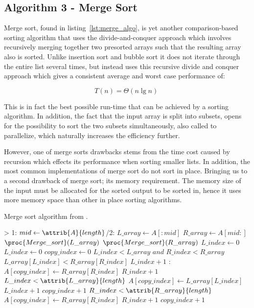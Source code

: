 \documentclass[sigconf, nonacm, natbib, screen, balance=False]{acmart}
\begin{document}
\subsection{Algorithm 3 - Merge Sort}\label{sec:algo3}

Merge sort, found in listing~\ref{lst:merge_algo}, is yet another comparison-based sorting algorithm that uses the divide-and-conquer approach which involves recursively merging together two presorted arrays such that the resulting array also is sorted. Unlike insertion sort and bubble sort it does not iterate through the entire list several times, but instead uses this recursive divide and conquer approach which gives a consistent average and worst case performance of: 

\begin{equation}
  T(n) = \Theta(n\lg n) \;  \label{eq:merge_sort_best}
\end{equation}

This is in fact the best possible run-time that can be achieved by a sorting algorithm. In addition, the fact that the input array is split into subsets, opens for the possibility to sort the two subsets simultaneously, also called to parallelize, which naturally increases the efficiency further.

However, one of merge sorts drawbacks stems from the time cost caused by recursion which effects its performance when sorting smaller lists. In addition, the most common implementations of merge sort do not sort in place. Bringing us to a second drawback of merge sort; its memory requirement. The memory size of the input must be allocated for the sorted output to be sorted in, hence it uses more memory space than other in place sorting algorithms. 

\begin{listing}
  \caption{Merge sort algorithm from \citet[Ch.~2.1]{CLRS_2009}.}
  \label{lst:merge_algo}

  \begin{codebox}
    \li \If {} > 1: 
    \li \Do
    $mid \gets \attrib{A}{length}$/2: 
    \li $L\_array\gets A[:mid]$
    \li $R\_array\gets A[mid:]$
    \li $\proc{Merge\_sort}(L\_array)$
    \li $\proc{Merge\_sort}(R\_array)$
    \li $L\_index\gets 0$
    \li $L\_index\gets 0$
    \li $copy\_index\gets 0$
    \li \While $L\_index < L\_array$ $and$ $R\_index < R\_array$ 
    \li \Do
    \If $L\_array[L\_index] < R\_array[R\_index]$
    \li \Do
    $L\_index + 1$
    \li \Else:
    \li $A[copy\_index] \gets R\_array[R\_index]$
    \li $R\_index + 1$
    \End
    \End
    \li \While $L\_index < \attrib{L\_array}{length}$
    \li \Do
    $A[copy\_index] \gets L\_array[L\_index]$
    \li $L\_index + 1$
    \li $copy\_index + 1$
    \End
    \li \While $R\_index < \attrib{R\_array}{length}$
    \li \Do
    $A[copy\_index] \gets R\_array[R\_index]$
    \li $R\_index + 1$
    \li $copy\_index + 1$    
  \end{codebox}
\end{listing}
\end{document}

